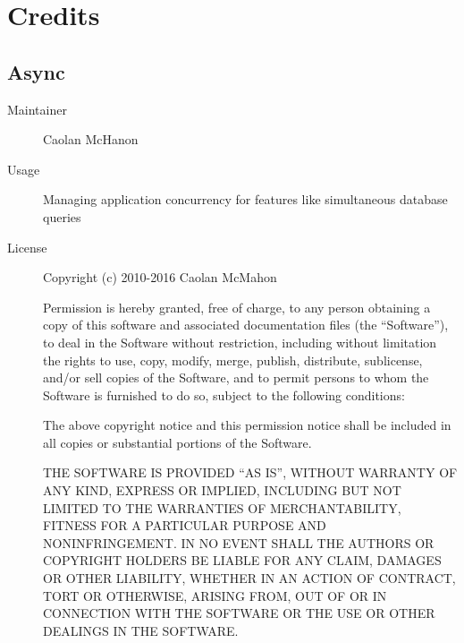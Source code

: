 \chapter{Credits}
\label{chapter:credits}
  \section*{Async}
    \begin{description}
      \item[Maintainer] Caolan McHanon
      \item[Usage] Managing application concurrency for features like simultaneous database queries
      \item[License] \scriptsize Copyright (c) 2010-2016 Caolan McMahon

        Permission is hereby granted, free of charge, to any person obtaining a copy
        of this software and associated documentation files (the ``Software''), to deal
        in the Software without restriction, including without limitation the rights
        to use, copy, modify, merge, publish, distribute, sublicense, and/or sell
        copies of the Software, and to permit persons to whom the Software is
        furnished to do so, subject to the following conditions:

        The above copyright notice and this permission notice shall be included in
        all copies or substantial portions of the Software.

        THE SOFTWARE IS PROVIDED ``AS IS'', WITHOUT WARRANTY OF ANY KIND, EXPRESS OR
        IMPLIED, INCLUDING BUT NOT LIMITED TO THE WARRANTIES OF MERCHANTABILITY,
        FITNESS FOR A PARTICULAR PURPOSE AND NONINFRINGEMENT. IN NO EVENT SHALL THE
        AUTHORS OR COPYRIGHT HOLDERS BE LIABLE FOR ANY CLAIM, DAMAGES OR OTHER
        LIABILITY, WHETHER IN AN ACTION OF CONTRACT, TORT OR OTHERWISE, ARISING FROM,
        OUT OF OR IN CONNECTION WITH THE SOFTWARE OR THE USE OR OTHER DEALINGS IN
        THE SOFTWARE.
    \end{description}

